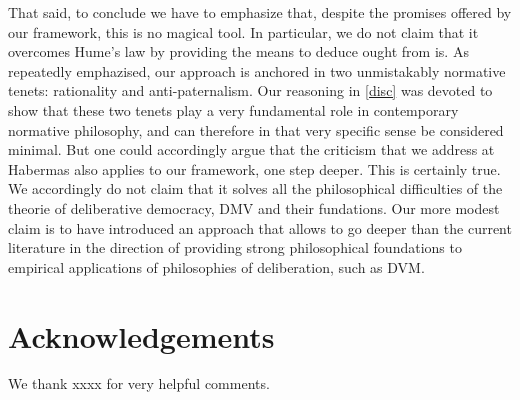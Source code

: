 \documentclass[version=3.21, pagesize, twoside=off, bibliography=totoc, DIV=calc, fontsize=12pt, a4paper, french, english]{scrartcl}
\newenvironment{acknowledgements}{
	\section*{Acknowledgements}
}{
}
\begin{document}
That said, to conclude we have to emphasize that, despite the promises offered by our framework, this is no magical tool. In particular, we do not claim that it overcomes Hume's law by providing the means to deduce ought from is. As repeatedly emphazised, our approach is anchored in two unmistakably normative tenets: rationality and anti-paternalism. Our reasoning in \cref{disc} was devoted to show that these two tenets play a very fundamental role in contemporary normative philosophy, and can therefore in that very specific sense be considered minimal. But one could accordingly argue that the criticism that we address at Habermas also applies to our framework, one step deeper. This is certainly true. We accordingly do not claim that it solves all the philosophical difficulties of the theorie of deliberative democracy, DMV and their fundations. Our more modest claim is to have introduced an approach that allows to go deeper than the current literature in the direction of providing strong philosophical foundations to empirical applications of philosophies of deliberation, such as DVM. 


\begin{acknowledgements}
We thank xxxx for very helpful comments.
\end{acknowledgements}


\end{document}
